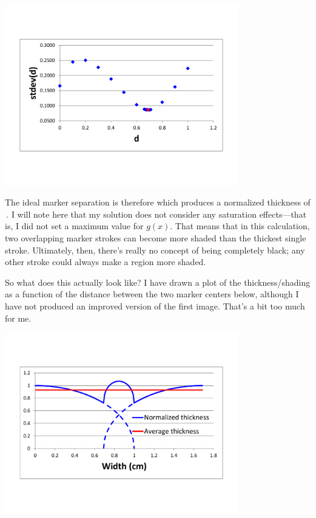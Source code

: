 \documentclass{article}
\begin{document}
\begin{center}
\includegraphics[clip, trim=0in 1in 0in 1in, width=4in]{numeric_stdev_chart.pdf}
\end{center}

The ideal marker separation is therefore
which produces a normalized thickness of
\,.
I will note here that my solution does not consider any saturation effects---that is, I did not set a maximum value for $g(x)$.
That means that in this calculation, two overlapping marker strokes can become more shaded than the thickest single stroke.
Ultimately, then, there's really no concept of being completely black; any other stroke could always make a region more shaded.

So what does this actually look like?
I have drawn a plot of the thickness/shading as a function of the distance between the two marker centers below, although I have not produced an improved version of the first image.
That's a bit too much for me.

\begin{center}
\includegraphics[clip, trim=0in 1in 0in 1in, width=4in]{thickness.pdf}
\end{center}
\end{document}
